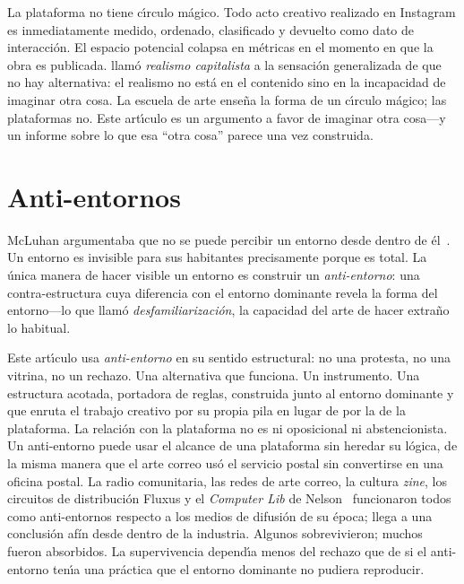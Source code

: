 \documentclass[10pt,letterpaper,twocolumn]{article}
\begin{document}
La plataforma no tiene c\'{\i}rculo m\'{a}gico. Todo acto creativo realizado en Instagram es inmediatamente medido, ordenado, clasificado y devuelto como dato de interacci\'{o}n. El espacio potencial colapsa en m\'{e}tricas en el momento en que la obra es publicada. \citet{fisher2009capitalist} llam\'{o} \emph{realismo capitalista} a la sensaci\'{o}n generalizada de que no hay alternativa: el realismo no est\'{a} en el contenido sino en la incapacidad de imaginar otra cosa. La escuela de arte ense\~{n}a la forma de un c\'{\i}rculo m\'{a}gico; las plataformas no. Este art\'{\i}culo es un argumento a favor de imaginar otra cosa---y un informe sobre lo que esa ``otra cosa'' parece una vez construida.

\section{Anti-entornos}

McLuhan argumentaba que no se puede percibir un entorno desde dentro de \'{e}l~\citep{mcluhan1964understanding, mcluhan1969playboy}. Un entorno es invisible para sus habitantes precisamente porque es total. La \'{u}nica manera de hacer visible un entorno es construir un \emph{anti-entorno}: una contra-estructura cuya diferencia con el entorno dominante revela la forma del entorno---lo que \citet{shklovsky1917art} llam\'{o} \emph{desfamiliarizaci\'{o}n}, la capacidad del arte de hacer extra\~{n}o lo habitual.

Este art\'{\i}culo usa \emph{anti-entorno} en su sentido estructural: no una protesta, no una vitrina, no un rechazo. Una alternativa que funciona. Un instrumento. Una estructura acotada, portadora de reglas, construida junto al entorno dominante y que enruta el trabajo creativo por su propia pila en lugar de por la de la plataforma. La relaci\'{o}n con la plataforma no es ni oposicional ni abstencionista. Un anti-entorno puede usar el alcance de una plataforma sin heredar su l\'{o}gica, de la misma manera que el arte correo us\'{o} el servicio postal sin convertirse en una oficina postal. La radio comunitaria, las redes de arte correo, la cultura \emph{zine}, los circuitos de distribuci\'{o}n Fluxus y el \emph{Computer Lib} de Nelson~\citep{nelson1974computerlib} funcionaron todos como anti-entornos respecto a los medios de difusi\'{o}n de su \'{e}poca; \citet{lanier2018ten} llega a una conclusi\'{o}n afín desde dentro de la industria. Algunos sobrevivieron; muchos fueron absorbidos. La supervivencia depend\'{\i}a menos del rechazo que de si el anti-entorno ten\'{\i}a una pr\'{a}ctica que el entorno dominante no pudiera reproducir.
\end{document}
